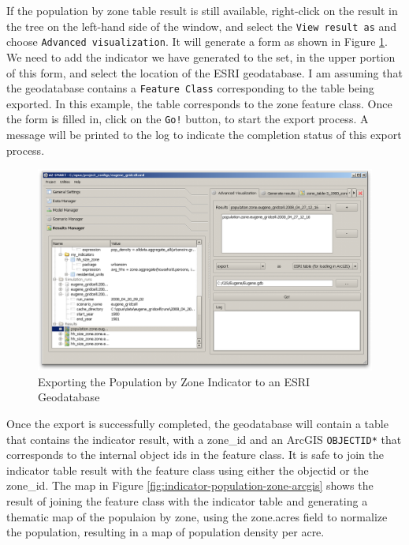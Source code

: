 If the population by zone table result is still available, right-click on the result in the tree on the left-hand side of the window, and select the \verb#View result as# and choose \verb#Advanced visualization#.  It will generate a form as shown in Figure \ref{fig:indicator-population-zone-export}.  We need to add the indicator we have generated to the set, in the upper portion of this form, and select the location of the ESRI geodatabase.  I am assuming that the geodatabase contains a \verb#Feature Class# corresponding to the table being exported. In this example, the table corresponds to the zone feature class.  Once the form is filled in, click on the \verb#Go!# button, to start the export process.  A message will be printed to the log to indicate the completion status of this export process.

\begin{figure}[htp]
\begin{center}
\includegraphics[scale=0.4]{graphics/indicator-population-zone-export.png}
\end{center}
\caption{Exporting the Population by Zone Indicator to an ESRI Geodatabase}
\label{fig:indicator-population-zone-export}
\end{figure}

Once the export is successfully completed, the geodatabase will contain a table that contains the indicator result, with a zone\_id and an ArcGIS \verb#OBJECTID*# that corresponds to the internal object ids in the feature class.  It is safe to join the indicator table result with the feature class using either the objectid or the zone\_id.  The map in Figure \ref{fig:indicator-population-zone-arcgis} shows the result of joining the feature class with the indicator table and generating a thematic map of the populaion by zone, using the zone.acres field to normalize the population, resulting in a map of population density per acre.


